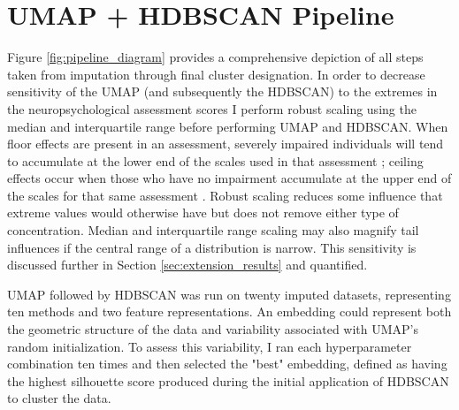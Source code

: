 \section{UMAP + HDBSCAN Pipeline}\label{sec:pipeline}
Figure \ref{fig:pipeline_diagram} provides a comprehensive depiction of all steps taken from imputation through final cluster designation. In order to decrease sensitivity of the UMAP (and subsequently the HDBSCAN) to the extremes in the neuropsychological assessment scores I perform robust scaling using the median and interquartile range \parencite{bellio2020analyzing,pinsky2023mad} before performing UMAP and HDBSCAN. When floor effects are present in an assessment, severely impaired individuals will tend to accumulate at the lower end of the scales used in that assessment \parencite{pinsky2023mad}; ceiling effects occur when those who have no impairment accumulate at the upper end of the scales for that same assessment \parencite{pinsky2023mad}. Robust scaling reduces some influence that extreme values would otherwise have but does not remove either type of concentration. Median and interquartile range scaling may also magnify tail influences if the central range of a distribution is narrow. This sensitivity is discussed further in Section \ref{sec:extension_results} and quantified.

UMAP followed by HDBSCAN was run on twenty imputed datasets, representing ten methods and two feature representations. An embedding could represent both the geometric structure of the data and variability associated with UMAP's random initialization. To assess this variability, I ran each hyperparameter combination ten times and then selected the "best" embedding, defined as having the highest silhouette score produced during the initial application of HDBSCAN to cluster the data.

